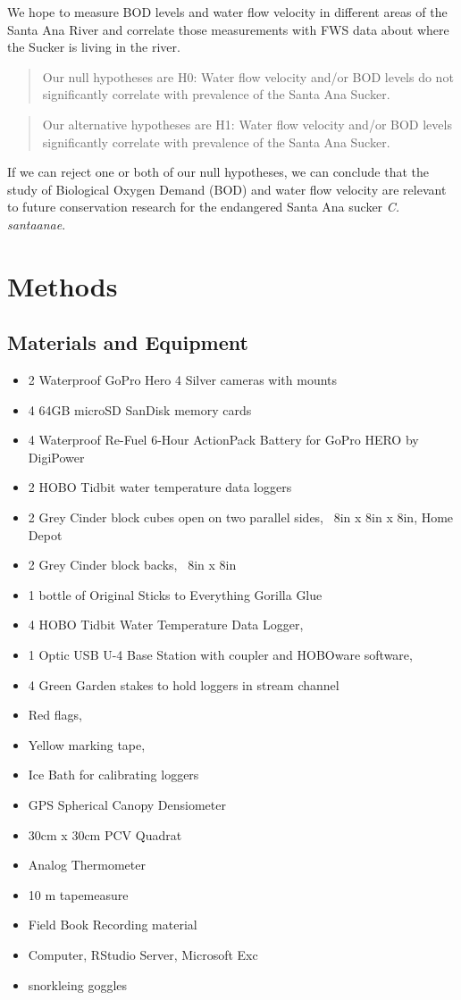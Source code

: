 \documentclass{article}\usepackage[]{graphicx}\usepackage[]{color}
\begin{document}
We hope to measure BOD levels and water flow velocity in different areas of the Santa Ana River and correlate those measurements with FWS data about where the Sucker is living in the river.
\begin{quote}
Our null hypotheses are H0: Water flow velocity and/or BOD levels do not significantly correlate with prevalence of the Santa Ana Sucker.
\end{quote}
\begin{quote}
Our alternative hypotheses are H1: Water flow velocity and/or BOD levels significantly correlate with prevalence of the Santa Ana Sucker.
\end{quote}
If we can reject one or both of our null hypotheses, we can conclude that the study of Biological Oxygen Demand (BOD) and water flow velocity are relevant to future conservation research for the endangered Santa Ana sucker \emph{C. santaanae}.


\section{Methods}

\subsection{Materials and Equipment}
\begin{itemize}
\item 2 Waterproof GoPro Hero 4 Silver cameras with mounts
\item 4 64GB microSD SanDisk memory cards
\item 4 Waterproof Re-Fuel 6-Hour ActionPack Battery for GoPro HERO by DigiPower
\item 2 HOBO Tidbit water temperature data loggers
\item 2 Grey Cinder block cubes open on two parallel sides, ~8in x 8in x 8in, Home Depot
\item 2 Grey Cinder block backs, ~8in x 8in
\item 1 bottle of Original Sticks to Everything Gorilla Glue
\item 4 HOBO Tidbit Water Temperature Data Logger,
\item 1 Optic USB U-4 Base Station with coupler and HOBOware software,
\item 4 Green Garden stakes to hold loggers in stream channel
\item Red flags,
\item Yellow marking tape,
\item Ice Bath for calibrating loggers
\item GPS Spherical Canopy Densiometer
\item 30cm x 30cm PCV Quadrat
\item Analog Thermometer
\item 10 m tapemeasure
\item Field Book Recording material
\item Computer, RStudio Server, Microsoft Exc
\item snorkleing goggles 

\end{itemize}
\end{document}
